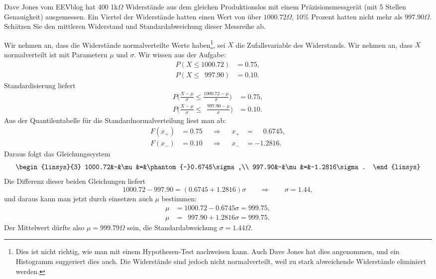 Dave Jones vom EEVblog hat 400 1k$\Omega$ Widerstände aus dem gleichen
Produktionslos mit einem Präzisionsmessgerät (mit 5 Stellen
Genauigkeit) ausgemessen. 
Ein Viertel der Widerstände hatten einen Wert von über $1000.72\Omega$,
10\% Prozent hatten nicht mehr als $997.90\Omega$.
Schätzen Sie den mittleren Widerstand und Standardabweichung dieser
Messreihe ab.


\begin{loesung}
Wir nehmen an, dass die Widerstände normalverteilte Werte haben\footnote{
Dies ist nicht richtig, wie man mit einem Hypothesen-Test nachweisen kann.
Auch Dave Jones hat dies angenommen, und ein Histogramm suggeriert
dies auch. Die Widerstände sind jedoch nicht normalverteilt, weil zu
stark abweichende Widerstände eliminiert werden.}, sei $X$ die Zufallsvariable
des Widerstands.
Wir nehmen an, dass $X$ normalverteilt ist mit Parametern $\mu$ und $\sigma$.
Wir wissen aus der Aufgabe:
\begin{equation}
\begin{aligned}
P(X\le 1000.72)&=0.75,
\\
P(X\le \phantom{0}997.90)&=0.10.
\end{aligned}
\label{60000042:prob}
\end{equation}
Standardisierung liefert
\begin{equation*}
\begin{aligned}
P\biggl(\frac{X-\mu}{\sigma}\le \frac{1000.72-\mu}{\sigma}\biggr)&=0.75,
\\
P\biggl(\frac{X-\mu}{\sigma}\le \phantom{0}\frac{997.90-\mu}{\sigma}\biggr)&=0.10.
\end{aligned}
\end{equation*}
Aus der Quantilentabelle für die Standardnormalverteilung liest man ab:
\[
\begin{aligned}
F(x_+)&=0.75&&\Rightarrow&&x_+&=\phantom{-}0.6745,\\
F(x_-)&=0.10&&\Rightarrow&&x_-&=-1.2816.
\end{aligned}
\]
Daraus folgt das Gleichungssystem
\[
\begin{linsys}{3}
1000.72&-&\mu&=&\phantom{-}0.6745\sigma,\\
 997.90&-&\mu&=&-1.2816\sigma.
\end{linsys}
\]
Die Differenz dieser beiden Gleichungen liefert
\[
1000.72-997.90 = (0.6745 + 1.2816)\sigma
\qquad
\Rightarrow
\qquad
\sigma = 1.44,
\]
und daraus kann man jetzt durch einsetzen auch $\mu$ bestimmen:
\begin{align*}
\mu&=1000.72-0.6745\sigma=999.75,\\
\mu&=\phantom{0}997.90+1.2816\sigma=999.75.
\end{align*}
Der Mittelwert dürfte also $\mu=999.79\Omega$ sein, die Standardabweichung
$\sigma=1.44\Omega$.
\end{loesung}

